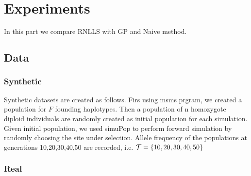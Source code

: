 \section{Experiments}
In this part we compare RNLLS with GP and Naive method. 
\subsection{Data}
\subsubsection{Synthetic}
Synthetic datasets are created as follows. Firs using msms prgram, we created a population for $F$ founding haplotypes. Then a population of n homozygote diploid individuals are randomly created as initial population for each simulation. Given initial population, we used simuPop to perform forward simulation by randomly choosing the site under selection. Allele frequency of the populations at generations 10,20,30,40,50 are recorded, i.e. ${\cal T}=\{10,20,30,40,50\}$
\subsubsection{Real}
